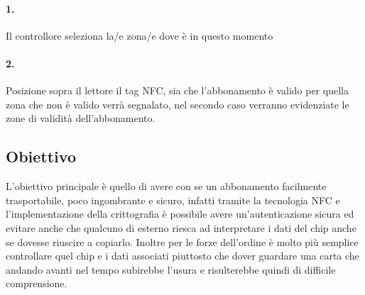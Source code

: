 \paragraph{1.} Il controllore seleziona la/e zona/e dove è in questo momento
\paragraph{2.} Posizione sopra il lettore il tag NFC, sia che l'abbonamento è valido per quella zona che non è valido verrà segnalato, nel secondo caso verranno evidenziate le zone di validità dell'abbonamento.

\subsection{Obiettivo}
\hspace{\parindent}L'obiettivo principale è quello di avere con se un abbonamento facilmente trasportabile, poco ingombrante e sicuro, infatti tramite la tecnologia NFC e l'implementazione della crittografia è possibile avere un'autenticazione sicura ed evitare anche che qualcuno di esterno riesca ad interpretare i dati del chip anche se dovesse riuscire a copiarlo. Inoltre per le forze dell'ordine è molto più semplice controllare quel chip e i dati associati piuttosto che dover guardare una carta che andando avanti nel tempo subirebbe l'usura e risulterebbe quindi di difficile comprensione.